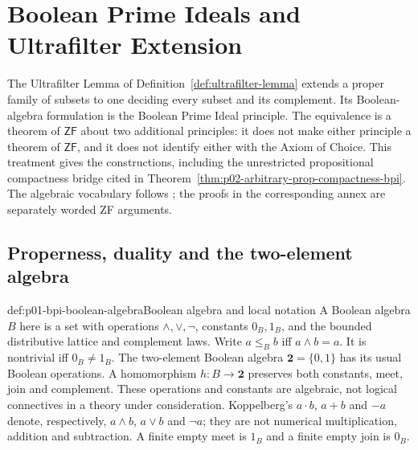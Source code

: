 \section{Boolean Prime Ideals and Ultrafilter Extension}
\label{sec:p01-boolean-prime-ideal-and-ultrafilters}

The Ultrafilter Lemma of Definition~\ref{def:ultrafilter-lemma} extends a
proper family of subsets to one deciding every subset and its complement.
Its Boolean-algebra formulation is the Boolean Prime Ideal principle.
The equivalence is a theorem of \(\mathsf{ZF}\) about two additional
principles: it does not make either principle a theorem of \(\mathsf{ZF}\),
and it does not identify either with the Axiom of Choice. This treatment gives
the constructions, including the unrestricted propositional compactness
bridge cited in Theorem~\ref{thm:p02-arbitrary-prop-compactness-bpi}.
The algebraic vocabulary follows \cite[Sections 2.2 and 5.4]{Koppelberg1989};
the proofs in the corresponding annex are separately worded ZF arguments.

\subsection{Properness, duality and the two-element algebra}
\label{sec:p01-bpi-algebraic-vocabulary}

\begin{hbdefinition}{def:p01-bpi-boolean-algebra}{Boolean algebra and local notation}
A Boolean algebra \(B\) here is a set with operations
\(\wedge,\vee,\neg\), constants \(0_B,1_B\), and the bounded distributive
lattice and complement laws. Write \(a\leq_B b\) iff
\(a\wedge b=a\). It is nontrivial iff \(0_B\ne1_B\).
The two-element Boolean algebra \(\mathbf2=\{0,1\}\) has its usual
Boolean operations. A homomorphism \(h:B\to\mathbf2\) preserves both
constants, meet, join and complement. These operations and constants are
algebraic, not logical connectives in a theory under consideration.
Koppelberg's \(a\cdot b\), \(a+b\) and \(-a\) denote, respectively,
\(a\wedge b\), \(a\vee b\) and \(\neg a\); they are not numerical
multiplication, addition and subtraction. A finite empty meet is \(1_B\)
and a finite empty join is \(0_B\).
\end{hbdefinition}

